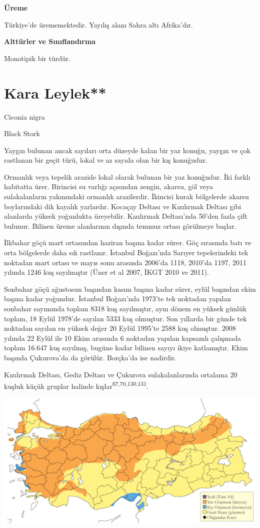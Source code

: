 \documentclass[
  letterpaper,
  DIV=11,
  numbers=noendperiod]{scrreprt}
\begin{document}
\textbf{Üreme}

Türkiye'de ürememektedir. Yayılış alanı Sahra altı Afrika'dır.

\textbf{Alttürler ve Sınıflandırma}

Monotipik bir türdür.

\section{Kara Leylek**}\label{kara-leylek}

Ciconia nigra

Black Stork

Yaygın bulunan ancak sayıları orta düzeyde kalan bir yaz konuğu, yaygın
ve çok rastlanan bir geçit türü, lokal ve az sayıda olan bir kış
konuğudur.

Ormanlık veya tepelik arazide lokal olarak bulunan bir yaz konuğudur.
İki farklı habitatta ürer. Birincisi su varlığı açısından zengin,
akarsu, göl veya sulakalanların yakınındaki ormanlık arazilerdir.
İkincisi kurak bölgelerde akarsu boylarındaki dik kayalık yarlardır.
Kocaçay Deltası ve Kızılırmak Deltası gibi alanlarda yüksek yoğunlukta
üreyebilir. Kızılırmak Deltası'nda 50'den fazla çift bulunur. Bilinen
üreme alanlarının dışında temmuz ortası görülmeye başlar.

İlkbahar göçü mart ortasından haziran başına kadar sürer. Göç sırasında
batı ve orta bölgelerde daha sık rastlanır. İstanbul Boğazı'nda Sarıyer
tepelerindeki tek noktadan mart ortası ve mayıs sonu arasında 2006'da
1118, 2010'da 1197, 2011 yılında 1246 kuş sayılmıştır (Üner et al 2007,
İKGT 2010 ve 2011).

Sonbahar göçü ağustosun başından kasım başına kadar sürer, eylül
başından ekim başına kadar yoğundur. İstanbul Boğazı'nda 1973'te tek
noktadan yapılan sonbahar sayımında toplam 8318 kuş sayılmıştır, aynı
dönem en yüksek günlük toplam, 18 Eylül 1978'de sayılan 5333 kuş
olmuştur. Son yıllarda bir günde tek noktadan sayılan en yüksek değer 20
Eylül 1995'te 2588 kuş olmuştur. 2008 yılında 22 Eylül ile 10 Ekim
arasında 6 noktadan yapılan kapsamlı çalışmada toplam 16.647 kuş
sayılmış, bugüne kadar bilinen sayıyı ikiye katlamıştır. Ekim başında
Çukurova'da da görülür. Borçka'da ise nadirdir.

Kızılırmak Deltası, Gediz Deltası ve Çukurova sulakalanlarında ortalama
20 kuşluk küçük gruplar halinde kışlar\textsuperscript{67,70,130,131}.

\includegraphics{images/harita_Page_059.png}
\end{document}
